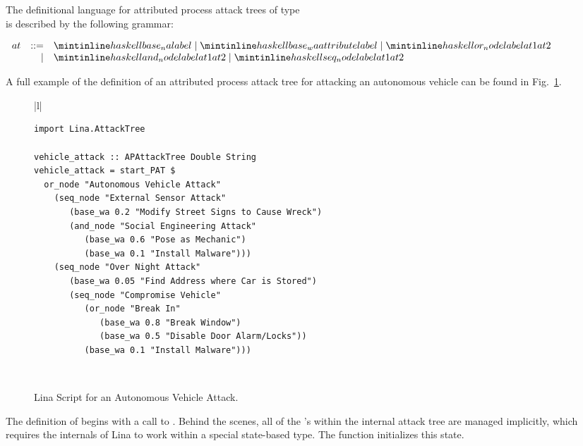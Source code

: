 The definitional language for attributed process attack trees of type \\
 is described by the following
grammar:
\begin{center}
  \footnotesize
  \begin{math}
    \begin{array}{lrlll}
      at & ::=  & \mh{base_na label} \mid \mh{base_wa attribute label} \mid \mh{or_node label at1 at2} \\
      & \mid & \mh{and_node label at1 at2} \mid \mh{seq_node label at1 at2}\\
    \end{array}
  \end{math}
\end{center}
A full example of the definition of an attributed process attack tree
for attacking an autonomous vehicle can be found in
Fig.~\ref{fig:vehicle_attack}. 
\begin{figure}
      \begin{tabular}{|l|}
        \hline\\[-7px]
      \begin{minipage}{\textwidth}
        \begin{verbatim}
import Lina.AttackTree

vehicle_attack :: APAttackTree Double String
vehicle_attack = start_PAT $
  or_node "Autonomous Vehicle Attack"
    (seq_node "External Sensor Attack"
       (base_wa 0.2 "Modify Street Signs to Cause Wreck")
       (and_node "Social Engineering Attack"
          (base_wa 0.6 "Pose as Mechanic")
          (base_wa 0.1 "Install Malware")))
    (seq_node "Over Night Attack"
       (base_wa 0.05 "Find Address where Car is Stored")
       (seq_node "Compromise Vehicle"
          (or_node "Break In"
             (base_wa 0.8 "Break Window")
             (base_wa 0.5 "Disable Door Alarm/Locks"))
          (base_wa 0.1 "Install Malware")))
        \end{verbatim}
        \vspace{2px}
      \end{minipage} \\
      \hline
    \end{tabular}
  \caption{Lina Script for an Autonomous Vehicle Attack.}
  \label{fig:vehicle_attack}
\end{figure}
The definition of  begins with a call to
.  Behind the scenes, all of the 's within the
internal attack tree are managed implicitly, which requires the
internals of Lina to work within a special state-based type.  The
function  initializes this state.

